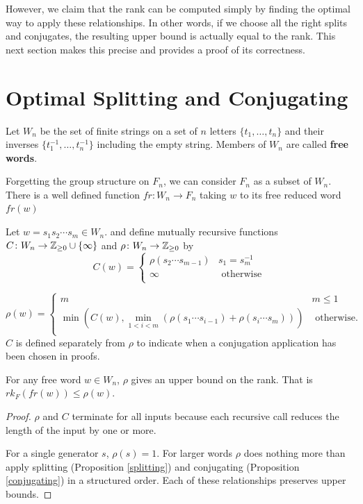 \documentclass[12pt]{thesis}
\begin{document}
However, we claim that the rank can be computed simply by finding
the optimal way to apply these relationships.
In other words, if we choose all the right splits and conjugates, the resulting
upper bound is actually equal to the rank.
This next section makes this precise and provides
a proof of its correctness.

\section{Optimal Splitting and Conjugating}

\begin{definition}
    Let $W_{n}$ be the set of finite strings on a set of $n$ letters $\{ t_{1}, \ldots, t_{n} \}$ 
    and their inverses $\{ t_{1}^{-1}, \ldots, t_{n}^{-1} \}$
    including the empty string.
    Members of $W_{n}$ are called \textbf{free words}.
\end{definition}

Forgetting the group structure on $F_{n}$,
we can consider $F_{n}$ as a subset of $W_{n}$.
There is a well defined function $fr \colon W_{n} \rightarrow F_{n}$
taking $w$ to its free reduced word $fr(w)$

Let $w = s_{1}s_{2} \cdots s_{m} \in W_{n}$.
and define mutually recursive functions $C \colon W_{n} \rightarrow \mathbb{Z}_{\geq 0} \cup \{ \infty \}$
and $\rho \colon W_{n} \rightarrow \mathbb{Z}_{\geq 0}$ by
\begin{equation}
    \label{conjugation-rule}
    C(w) =  \begin{cases}
        \rho(s_{2} \cdots s_{m - 1}) & s_{1} = s_{m}^{-1} \\
        \infty & \text{ otherwise } \\
    \end{cases}
\end{equation}

\begin{equation}
    \label{rank-rule}
\rho(w) =
\begin{cases}
    m & m \leq 1 \\
    \min(C(w), \min_{1< i < m} ( \rho(s_{1} \cdots s_{i - 1}) + \rho(s_{i} \cdots s_{m}) ) ) &  \text{ otherwise. } \\
\end{cases}
\end{equation}
$C$ is defined separately from $\rho$ to indicate when a conjugation
application has been chosen in proofs.

\begin{proposition}
    \label{upper-bounds}
    For any free word $w \in W_{n}$, $\rho$ gives an upper bound on the rank. 
    That is $rk_{F}(fr(w)) \leq \rho(w)$.
\end{proposition}
\begin{proof}
    $\rho$ and $C$ terminate for all inputs because each recursive call reduces the length of the input
    by one or more.

    For a single generator $s$, $\rho(s) = 1$.
    For larger words $\rho$ does nothing more than apply splitting (Proposition \ref{splitting}) and conjugating (Proposition \ref{conjugating}) in a structured order.
    Each of these relationships preserves upper bounds.
\end{proof}
\end{document}
